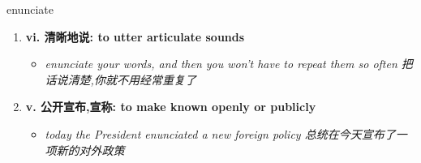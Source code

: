 
\begin{frame}
{\huge enunciate}
\begin{center}
\begin{enumerate}\Large
  \item \textbf{vi. 清晰地说: to utter articulate sounds}
  \begin{itemize}
    \item \em{\Large{enunciate your words, and then you won't have to repeat them so often 把话说清楚,你就不用经常重复了}}
  \end{itemize}
  \item \textbf{v. 公开宣布,宣称: to make known openly or publicly}
  \begin{itemize}
    \item \em{\Large{today the President enunciated a new foreign policy 总统在今天宣布了一项新的对外政策}}
  \end{itemize}
\end{enumerate}
\end{center}
\end{frame}
